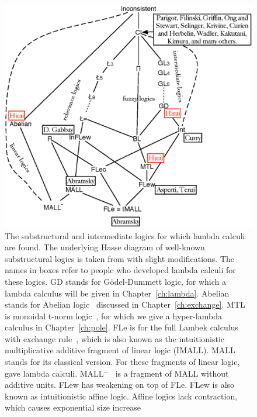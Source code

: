  \begin{figure}
  \centering
  \includegraphics[scale=0.8]{lattice.eps}
  \caption[The lattice of substructural and intermediate logics, some of
  which with known lambda calculi.]
  {\small
  The substructural and intermediate logics for which lambda calculi are found.
  The underlying Hasse diagram of well-known substructural logics is
  taken from
  \cite[p.~120]{residuated} with slight modifications.
  The names in boxes refer to people who developed lambda calculi for
  these logics.{
  \textsf{GD} stands for G\"odel-Dummett logic, for which
  a lambda calculus will be given in
  Chapter~\ref{ch:lambda}.
  \textsf{Abelian} stands for Abelian
  logic~\citep{meyer-slaney-1989,casari1989,metcalfe2002}
  discussed in Chapter~\ref{ch:exchange}.
  \textsf{MTL} is monoidal t-norm logic~\cite{Esteva2001271}, for which
  we give a hyper-lambda calculus in Chapter~\ref{ch:pole}.
  \textsf{FLe} is for the full Lambek calculus with exchange
  rule~\citep[p.86]{residuated}, which is also known as the
  intuitionistic
  multiplicative additive fragment of linear logic (\textsf{IMALL}).
  \textsf{MALL} stands for its classical version.  For these fragments of linear
  logic,
  \citet{abramsky1993computational} gave lambda calculi.
  \textsf{MALL}$^-$~\citep{girard1987}
  is a fragment of \textsf{MALL} without additive
  units.
  \textsf{FLew} has weakening on top of \textsf{FLe}.
  \textsf{FLew} is also known as intuitionistic affine logic.
  Affine logics lack contraction, which causes exponential size increase
}}
\end{figure}
